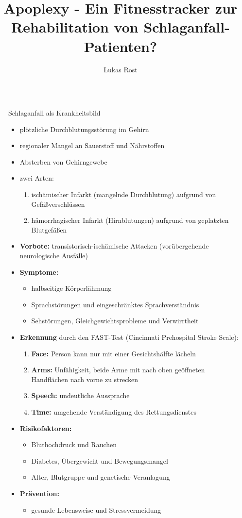 \documentclass[final,20pt]{beamer}
\title{Apoplexy - Ein Fitnesstracker zur Rehabilitation von Schlaganfall-Patienten?}
\author{Lukas Rost}
\institute{Albert-Schweitzer-Gymnasium Erfurt}
\newlength{\sepwidth}
\newlength{\colwidth}
\newcommand{\separatorcolumn}{\begin{column}{\sepwidth}\end{column}}
\begin{document}
\begin{frame}[t]
\begin{columns}[t]
\separatorcolumn

\begin{column}{\colwidth}

  \begin{alertblock}{Schlaganfall als Krankheitsbild}
  	\begin{itemize}
  		\item plötzliche Durchblutungsstörung im Gehirn
  		\item regionaler Mangel an Sauerstoff und Nährstoffen
  		\item Absterben von Gehirngewebe
  		\item zwei Arten:
  		\begin{enumerate}
  			\item ischämischer Infarkt (mangelnde Durchblutung) aufgrund von Gefäßverschlüssen
  			\item hämorrhagischer Infarkt (Hirnblutungen) aufgrund von geplatzten Blutgefäßen
  		\end{enumerate}
  		\item \textbf{Vorbote:} transistorisch-ischämische Attacken (vorübergehende neurologische Ausfälle)
  		\item \textbf{Symptome:}
  		\begin{itemize}
  			\item halbseitige Körperlähmung
  			\item Sprachstörungen und eingeschränktes Sprachverständnis
  			\item Sehstörungen, Gleichgewichtsprobleme und Verwirrtheit
  		\end{itemize}
  		\item \textbf{Erkennung} durch den FAST-Test (Cincinnati Prehospital Stroke Scale):
  		\begin{enumerate}
  			\item \textbf{Face:} Person kann nur mit einer Gesichtshälfte lächeln
  			\item \textbf{Arms:} Unfähigkeit, beide Arme mit nach oben geöffneten Handflächen nach vorne
  			zu strecken
  			\item \textbf{Speech:} undeutliche Aussprache
  			\item \textbf{Time:} umgehende Verständigung des Rettungsdienstes
  		\end{enumerate}
  		\item \textbf{Risikofaktoren:}
  		 \begin{itemize}
  		 	\item Bluthochdruck und Rauchen
  		 	\item Diabetes, Übergewicht und Bewegungsmangel
  		 	\item Alter, Blutgruppe und genetische Veranlagung
  		 \end{itemize}
  	 	\item \textbf{Prävention:}
  	 	\begin{itemize}
  	 		\item gesunde Lebensweise und Stressvermeidung
  	 	\end{itemize}
  	\end{itemize}
  

\end{alertblock}
\end{column}
\end{columns}
\end{frame}
\end{document}
